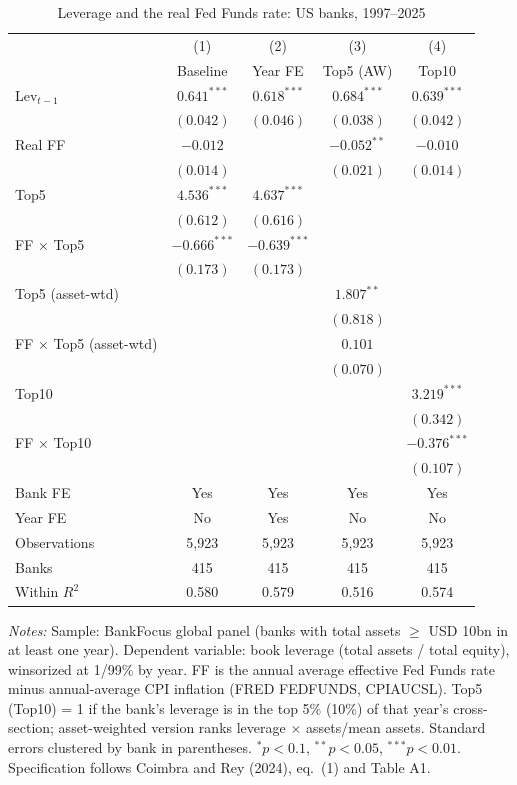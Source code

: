 \documentclass[11pt]{article}
\begin{document}
\clearpage

\begin{table}[htbp]
\centering
\small
\begin{threeparttable}
\caption{Leverage and the real Fed Funds rate: US banks, 1997--2025}
\label{tab:cr_eq1_2}
\begin{tabular}{lcccc}
\toprule
 & (1) & (2) & (3) & (4) \\
 & Baseline & Year FE & Top5 (AW) & Top10 \\
\midrule
Lev$_{t-1}$ & $0.641^{***}$ & $0.618^{***}$ & $0.684^{***}$ & $0.639^{***}$ \\
 & $(0.042)$ & $(0.046)$ & $(0.038)$ & $(0.042)$ \\[2pt]
Real FF & $-0.012$ &  & $-0.052^{**}$ & $-0.010$ \\
 & $(0.014)$ &  & $(0.021)$ & $(0.014)$ \\[2pt]
Top5 & $4.536^{***}$ & $4.637^{***}$ &  &  \\
 & $(0.612)$ & $(0.616)$ &  &  \\[2pt]
FF $\times$ Top5 & $-0.666^{***}$ & $-0.639^{***}$ &  &  \\
 & $(0.173)$ & $(0.173)$ &  &  \\[2pt]
Top5 (asset-wtd) &  &  & $1.807^{**}$ &  \\
 &  &  & $(0.818)$ &  \\[2pt]
FF $\times$ Top5 (asset-wtd) &  &  & $0.101$ &  \\
 &  &  & $(0.070)$ &  \\[2pt]
Top10 &  &  &  & $3.219^{***}$ \\
 &  &  &  & $(0.342)$ \\[2pt]
FF $\times$ Top10 &  &  &  & $-0.376^{***}$ \\
 &  &  &  & $(0.107)$ \\
\midrule
Bank FE & Yes & Yes & Yes & Yes \\
Year FE & No & Yes & No & No \\
Observations & 5,923 & 5,923 & 5,923 & 5,923 \\
Banks & 415 & 415 & 415 & 415 \\
Within $R^2$ & 0.580 & 0.579 & 0.516 & 0.574 \\
\bottomrule
\end{tabular}
\begin{tablenotes}[flushleft]
\footnotesize
\item \textit{Notes:} Sample: BankFocus global panel (banks with total assets $\geq$ USD 10bn in at least one year). Dependent variable: book leverage (total assets / total equity), winsorized at 1/99\% by year. FF is the annual average effective Fed Funds rate minus annual-average CPI inflation (FRED FEDFUNDS, CPIAUCSL). Top5 (Top10) = 1 if the bank's leverage is in the top 5\% (10\%) of that year's cross-section; asset-weighted version ranks leverage $\times$ assets/mean assets. Standard errors clustered by bank in parentheses. $^{*}p<0.1$, $^{**}p<0.05$, $^{***}p<0.01$. Specification follows Coimbra and Rey (2024), eq.~(1) and Table A1.
\end{tablenotes}
\end{threeparttable}
\end{table}
\end{document}
